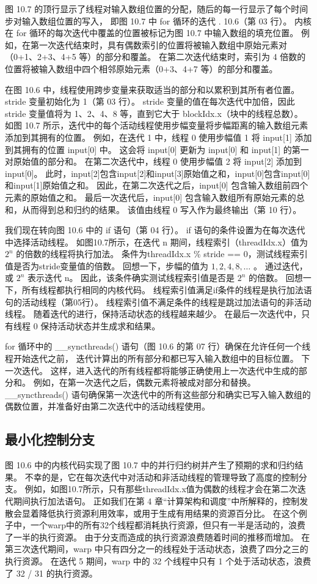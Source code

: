图 10.7 的顶行显示了线程对输入数组位置的分配，随后的每一行显示了每个时间步对输入数组位置的写入，
即图 10.7 中 for 循环的迭代 . 10.6（第 03 行）。 
内核在 for 循环的每次迭代中覆盖的位置被标记为图 10.7 中输入数组的填充位置。 
例如，在第一次迭代结束时，具有偶数索引的位置将被输入数组中原始元素对（0+1、2+3、4+5 等）的部分和覆盖。 
在第二次迭代结束时，索引为 4 倍数的位置将被输入数组中四个相邻原始元素（0+3、4+7 等）的部分和覆盖。

在图 10.6 中，线程使用跨步变量来获取适当的部分和以累积到其所有者位置。 stride 变量初始化为 1（第 03 行）。 
stride 变量的值在每次迭代中加倍，因此 stride 变量值将为 1、2、4、8 等，直到它大于 blockIdx.x（块中的线程总数）。 
如图 10.7 所示，迭代中的每个活动线程使用步幅变量将步幅距离的输入数组元素添加到其拥有的位置。 
例如，在迭代 1 中，线程 0 使用步幅值 1 将 input[1] 添加到其拥有的位置 input[0] 中。 
这会将 input[0] 更新为 input[0] 和 input[1] 的第一对原始值的部分和。 
在第二次迭代中，线程 0 使用步幅值 2 将 input[2] 添加到 input[0]。 
此时，input[2]包含input[2]和input[3]原始值之和，input[0]包含input[0]和input[1]原始值之和。 
因此，在第二次迭代之后，input[0] 包含输入数组前四个元素的原始值之和。 
最后一次迭代后，input[0] 包含输入数组所有原始元素的总和，从而得到总和归约的结果。 
该值由线程 0 写入作为最终输出（第 10 行）。

我们现在转向图 10.6 中的 if 语句（第 04 行）。 if 语句的条件设置为在每次迭代中选择活动线程。 
如图10.7所示，在迭代 n 期间，线程索引（threadIdx.x）值为 $2^n$ 的倍数的线程将执行加法。 
条件为threadIdx.x \% stride == 0，测试线程索引值是否为stride变量值的倍数。 
回想一下，步幅的值为 $1, 2, 4, 8, \ldots$ 。 通过迭代，或 $2^n$ 表示迭代 n。 
因此，该条件确实测试线程索引值是否是 $2^n$ 的倍数。 回想一下，所有线程都执行相同的内核代码。 
线程索引值满足if条件的线程是执行加法语句的活动线程（第05行）。 线程索引值不满足条件的线程是跳过加法语句的非活动线程。 
随着迭代的进行，保持活动状态的线程越来越少。 在最后一次迭代中，只有线程 0 保持活动状态并生成求和结果。

for 循环中的 \_\_syncthreads() 语句（图 10.6 的第 07 行）确保在允许任何一个线程开始迭代之前，
迭代计算出的所有部分和都已写入输入数组中的目标位置。 下一次迭代。 
这样，进入迭代的所有线程都将能够正确使用上一次迭代中生成的部分和。 
例如，在第一次迭代之后，偶数元素将被成对部分和替换。 
\_\_syncthreads() 语句确保第一次迭代中的所有这些部分和确实已写入输入数组的偶数位置，并准备好由第二次迭代中的活动线程使用。

\subsection{最小化控制分支}
图 10.6 中的内核代码实现了图 10.7 中的并行归约树并产生了预期的求和归约结果。 
不幸的是，它在每次迭代中对活动和非活动线程的管理导致了高度的控制分支。 
例如，如图10.7所示，只有那些threadIdx.x值为偶数的线程才会在第二次迭代期间执行加法语句。 
正如我们在第 4 章“计算架构和调度”中所解释的，控制发散会显着降低执行资源利用效率，或用于生成有用结果的资源百分比。 
在这个例子中，一个warp中的所有32个线程都消耗执行资源，但只有一半是活动的，浪费了一半的执行资源。 
由于分支而造成的执行资源浪费随着时间的推移而增加。 
在第三次迭代期间，warp 中只有四分之一的线程处于活动状态，浪费了四分之三的执行资源。 
在迭代 5 期间，warp 中的 32 个线程中只有 1 个处于活动状态，浪费了 32 / 31 的执行资源。


